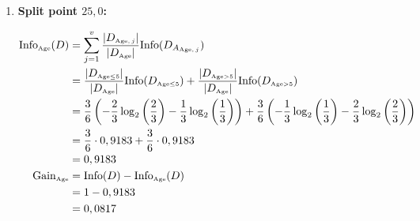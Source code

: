 \documentclass[
english,
smallborders
]{i6prcsht}
\newcommand{\OfSpecificValue}[3]{_{\text{\tiny #1#2#3}}}
\newcommand{\OfAttribute}[1]{_{\text{\tiny #1}}}
\begin{document}
\begin{solution}
\begin{enumerate}
\begin{enumerate}
\begin{enumerate}
\begin{enumerate}
					                  \item \textbf{Split point $25,0$:}

					                        \begin{alignat*}{2}
						                        \text{Info}\OfAttribute{Age}(D) & = \sum_{j=1}^v \frac{|D\OfAttribute{Age$,j$}|}{|D\OfAttribute{Age}|} \text{Info}(D_{A\OfAttribute{Age$,j$}})                                                                                                                            \\
						                                                        & = \frac{|D\OfSpecificValue{Age}{$\leq$}{5}|}{|D\OfAttribute{Age}|} \text{Info}(D\OfSpecificValue{Age}{$\leq$}{5}) + \frac{|D\OfSpecificValue{Age}{$>$}{5}|}{|D\OfAttribute{Age}|} \text{Info}(D\OfSpecificValue{Age}{$>$}{5})           \\
						                                                        & = \frac{3}{6} \left(-\frac{2}{3} \log_2\left(\frac{2}{3}\right) - \frac{1}{3} \log_2\left(\frac{1}{3}\right)\right) + \frac{3}{6} \left(-\frac{1}{3} \log_2\left(\frac{1}{3}\right) - \frac{2}{3} \log_2\left(\frac{2}{3}\right)\right) \\
						                                                        & = \frac{3}{6} \cdot 0,9183 + \frac{3}{6} \cdot 0,9183                                                                                                                                                                                   \\
						                                                        & = 0,9183                                                                                                                                                                                                                                \\
						                        \text{Gain}\OfAttribute{Age}    & = \text{Info}(D) - \text{Info}\OfAttribute{Age}(D)                                                                                                                                                                                      \\
						                                                        & = 1 - 0,9183                                                                                                                                                                                                                            \\
						                                                        & = 0,0817                                                                                                                                                                                                                                \\
					                        \end{alignat*}


\end{enumerate}
\end{enumerate}
\end{enumerate}
\end{enumerate}
\end{solution}
\end{document}
